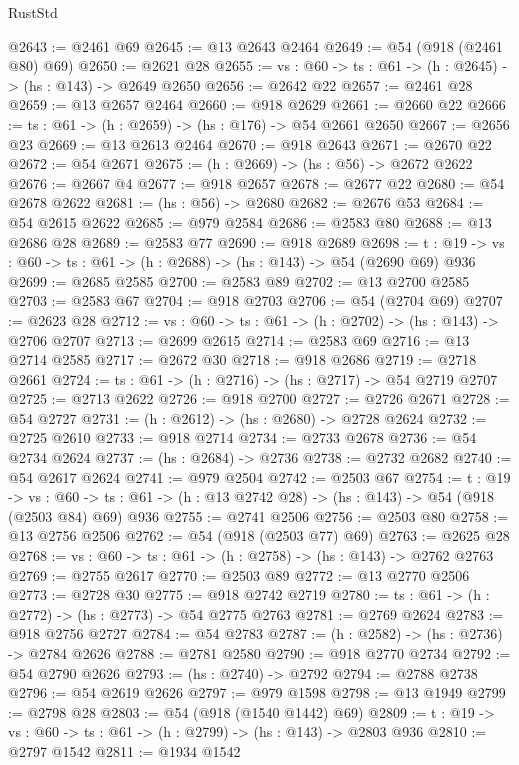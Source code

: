 \begin{lexlean}{RustStd}
\begin{coremodule}
@2643 := @2461 @69
@2645 := @13 @2643 @2464
@2649 := @54 (@918 (@2461 @80) @69)
@2650 := @2621 @28
@2655 := {vs : @60} -> {ts : @61} -> (h : @2645) -> (hs : @143) -> @2649 @2650
@2656 := @2642 @22
@2657 := @2461 @28
@2659 := @13 @2657 @2464
@2660 := @918 @2629
@2661 := @2660 @22
@2666 := {ts : @61} -> (h : @2659) -> (hs : @176) -> @54 @2661 @2650
@2667 := @2656 @23
@2669 := @13 @2613 @2464
@2670 := @918 @2643
@2671 := @2670 @22
@2672 := @54 @2671
@2675 := (h : @2669) -> (hs : @56) -> @2672 @2622
@2676 := @2667 @4
@2677 := @918 @2657
@2678 := @2677 @22
@2680 := @54 @2678 @2622
@2681 := (hs : @56) -> @2680
@2682 := @2676 @53
@2684 := @54 @2615 @2622
@2685 := @979 @2584
@2686 := @2583 @80
@2688 := @13 @2686 @28
@2689 := @2583 @77
@2690 := @918 @2689
@2698 := {t : @19} -> {vs : @60} -> {ts : @61} -> (h : @2688) -> (hs : @143) -> @54 (@2690 @69) @936
@2699 := @2685 @2585
@2700 := @2583 @89
@2702 := @13 @2700 @2585
@2703 := @2583 @67
@2704 := @918 @2703
@2706 := @54 (@2704 @69)
@2707 := @2623 @28
@2712 := {vs : @60} -> {ts : @61} -> (h : @2702) -> (hs : @143) -> @2706 @2707
@2713 := @2699 @2615
@2714 := @2583 @69
@2716 := @13 @2714 @2585
@2717 := @2672 @30
@2718 := @918 @2686
@2719 := @2718 @2661
@2724 := {ts : @61} -> (h : @2716) -> (hs : @2717) -> @54 @2719 @2707
@2725 := @2713 @2622
@2726 := @918 @2700
@2727 := @2726 @2671
@2728 := @54 @2727
@2731 := (h : @2612) -> (hs : @2680) -> @2728 @2624
@2732 := @2725 @2610
@2733 := @918 @2714
@2734 := @2733 @2678
@2736 := @54 @2734 @2624
@2737 := (hs : @2684) -> @2736
@2738 := @2732 @2682
@2740 := @54 @2617 @2624
@2741 := @979 @2504
@2742 := @2503 @67
@2754 := {t : @19} ->
  {vs : @60} -> {ts : @61} -> (h : @13 @2742 @28) -> (hs : @143) -> @54 (@918 (@2503 @84) @69) @936
@2755 := @2741 @2506
@2756 := @2503 @80
@2758 := @13 @2756 @2506
@2762 := @54 (@918 (@2503 @77) @69)
@2763 := @2625 @28
@2768 := {vs : @60} -> {ts : @61} -> (h : @2758) -> (hs : @143) -> @2762 @2763
@2769 := @2755 @2617
@2770 := @2503 @89
@2772 := @13 @2770 @2506
@2773 := @2728 @30
@2775 := @918 @2742 @2719
@2780 := {ts : @61} -> (h : @2772) -> (hs : @2773) -> @54 @2775 @2763
@2781 := @2769 @2624
@2783 := @918 @2756 @2727
@2784 := @54 @2783
@2787 := (h : @2582) -> (hs : @2736) -> @2784 @2626
@2788 := @2781 @2580
@2790 := @918 @2770 @2734
@2792 := @54 @2790 @2626
@2793 := (hs : @2740) -> @2792
@2794 := @2788 @2738
@2796 := @54 @2619 @2626
@2797 := @979 @1598
@2798 := @13 @1949
@2799 := @2798 @28
@2803 := @54 (@918 (@1540 @1442) @69)
@2809 := {t : @19} -> {vs : @60} -> {ts : @61} -> (h : @2799) -> (hs : @143) -> @2803 @936
@2810 := @2797 @1542
@2811 := @1934 @1542

\end{coremodule}
\end{lexlean}
